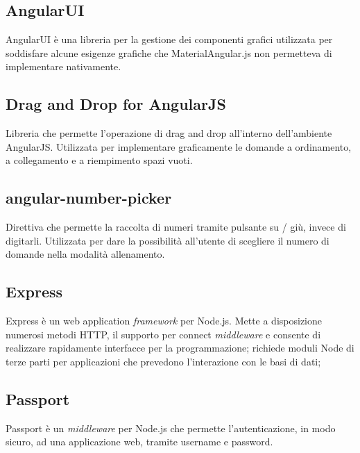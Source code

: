 \subsection{AngularUI}
AngularUI è una libreria per la gestione dei componenti grafici utilizzata per soddisfare alcune esigenze grafiche che MaterialAngular.js non permetteva di implementare nativamente.
\subsection{Drag and Drop for AngularJS}
Libreria che permette l'operazione di drag and drop all'interno dell'ambiente AngularJS. Utilizzata per implementare graficamente le domande a ordinamento, a collegamento e a riempimento spazi vuoti.
\subsection{angular-number-picker}
Direttiva che permette la raccolta di numeri tramite pulsante su / giù, invece di digitarli. Utilizzata per dare la possibilità all'utente di scegliere il numero di domande nella modalità allenamento.
\subsection{Express}
Express è un web application \textit{framework} per Node.js. Mette a disposizione numerosi metodi HTTP, il supporto per connect \textit{middleware} e consente di realizzare rapidamente interfacce per la programmazione; richiede moduli Node di terze parti per applicazioni che prevedono l'interazione con le basi di dati;
\subsection{Passport}
Passport è un \textit{middleware} per Node.js che permette l'autenticazione, in modo sicuro, ad una applicazione web, tramite username e password. 